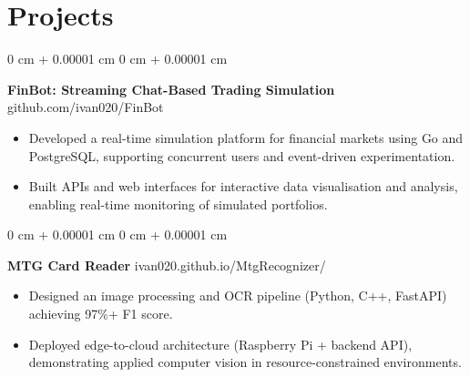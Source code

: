 \documentclass[6pt, letterpaper]{article}
\newenvironment{highlights}{
    \begin{itemize}[
        topsep=0.03 cm,
        parsep=0.03 cm,
        partopsep=0pt,
        itemsep=0pt,
        leftmargin=0 cm + 10pt
    ]
}{
    \end{itemize}
} %
\newenvironment{onecolentry}{
    \begin{adjustwidth}{
        0 cm + 0.00001 cm
    }{
        0 cm + 0.00001 cm
    }
}{
    \end{adjustwidth}
} %
\begin{document}
    \section{Projects}

    \begin{onecolentry}
        \textbf{FinBot: Streaming Chat-Based Trading Simulation} \hfill github.com/ivan020/FinBot

        \begin{highlights}

            \item Developed a real-time simulation platform for financial markets using Go and PostgreSQL, supporting concurrent users and event-driven experimentation.
            \item Built APIs and web interfaces for interactive data visualisation and analysis, enabling real-time monitoring of simulated portfolios.

        \end{highlights}
    \end{onecolentry}

    \begin{onecolentry}
        \textbf{MTG Card Reader} \hfill ivan020.github.io/MtgRecognizer/

        \begin{highlights}

            \item Designed an image processing and OCR pipeline (Python, C++, FastAPI) achieving 97\%+ F1 score.
            \item Deployed edge-to-cloud architecture (Raspberry Pi + backend API), demonstrating applied computer vision in resource-constrained environments.

        \end{highlights}
    \end{onecolentry}

\end{document}
